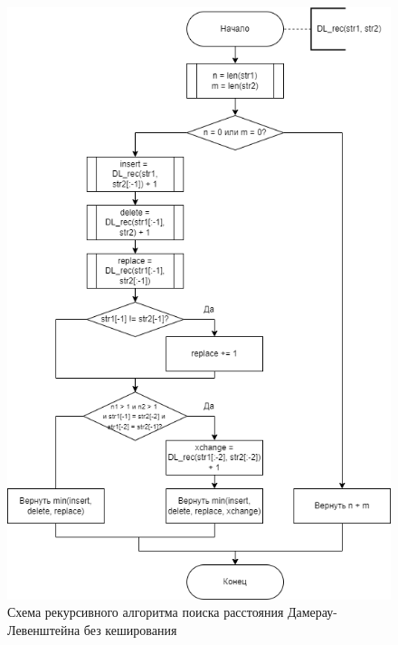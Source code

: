 \begin{figure}[h!btp]
    \captionsetup{justification=centering}
	\centering
	\includegraphics[width=380pt]{inc/dl-rec.png}
	\caption{Схема рекурсивного алгоритма поиска расстояния Дамерау-Левенштейна без кеширования}
	\label{fig:dl-rec}	
\end{figure}
\clearpage

